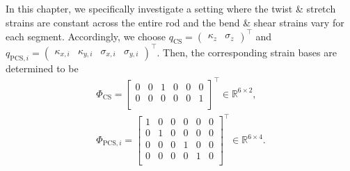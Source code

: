 In this chapter, we specifically investigate a setting where the twist \& stretch strains are constant across the entire rod and the bend \& shear strains vary for each segment.
Accordingly, we choose $q_\mathrm{CS} = \begin{pmatrix} \kappa_z & \sigma_z \end{pmatrix}^\top$ and $q_{\mathrm{PCS},i} = \begin{pmatrix} \kappa_{x,i} & \kappa_{y,i} & \sigma_{x,i} & \sigma_{y,i} \end{pmatrix}^\top$.
Then, the corresponding strain bases are determined to be
\begin{equation}
\begin{split}
    \Phi_\mathrm{CS} = \begin{bmatrix}
        0 & 0 & 1 & 0 & 0 & 0\\
        0 & 0 & 0 & 0 & 0 & 1\\
    \end{bmatrix}^\top \in \mathbb{R}^{6 \times 2},\\
    \Phi_{\mathrm{PCS},i} = \begin{bmatrix}
        1 & 0 & 0 & 0 & 0 & 0\\
        0 & 1 & 0 & 0 & 0 & 0\\
        0 & 0 & 0 & 1 & 0 & 0\\
        0 & 0 & 0 & 0 & 1 & 0\\
    \end{bmatrix}^\top \in \mathbb{R}^{6 \times 4}.
\end{split}
\end{equation}

